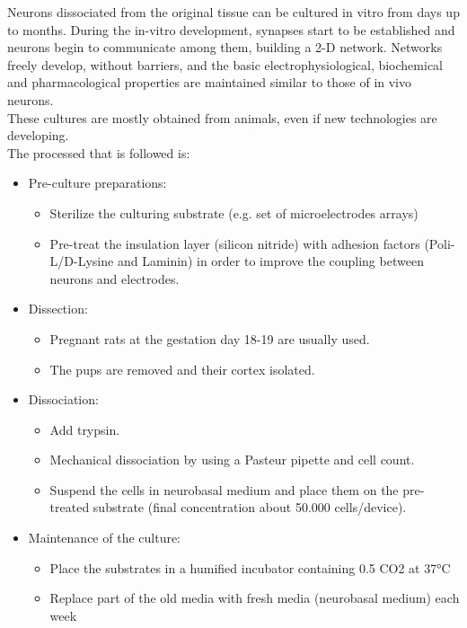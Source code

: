 Neurons dissociated from the original tissue can be cultured in vitro from 
days up to months. During the in-vitro development, synapses start to be 
established and neurons begin to communicate among them, building a 2-D 
network. Networks freely develop, without barriers, and the basic 
electrophysiological, biochemical and pharmacological properties are 
maintained similar to those of in vivo neurons.\\
These cultures are mostly obtained from animals, even if new technologies 
are developing.\\
The processed that is followed is:
\begin{itemize}
    \item Pre-culture preparations:
    
    \begin{itemize}
        \item Sterilize the culturing substrate (e.g. set of 
microelectrodes arrays)
        \item Pre-treat the insulation layer (silicon nitride) with 
adhesion factors (Poli-L/D-Lysine and Laminin) in order to improve the 
coupling between neurons and electrodes.
    \end{itemize}
    
    \item Dissection:
    
    \begin{itemize}
        \item Pregnant rats at the gestation day 18-19 are usually used. 
        \item The pups are removed and their cortex isolated.
    \end{itemize}
    
    \item Dissociation:
    
    \begin{itemize}
        \item Add trypsin.
        \item Mechanical dissociation by using a Pasteur pipette and cell 
count.
        \item Suspend the cells in neurobasal medium and place them on the 
pre-treated substrate (final concentration about 50.000 cells/device).
    \end{itemize}
    
    \item Maintenance of the culture:
    
    \begin{itemize}
        \item Place the substrates in a humified incubator containing 0.5 
CO2 at 37°C
        \item Replace part of the old media with fresh media (neurobasal 
medium) each week
    \end{itemize}
\end{itemize}

